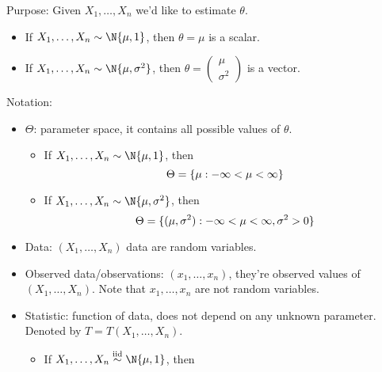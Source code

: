 Purpose: Given $ X_1,\ldots,X_n $ we'd like to estimate
$ \theta $.
\begin{Example}{}{}
      \begin{itemize}
            \item If $ X_1,\ldots,X_n \sim \N{\mu,1} $,
                  then $ \theta=\mu $ is a scalar.
            \item If $ X_1,\ldots,X_n \sim \N{\mu,\sigma^2} $, then
                  $ \theta=\begin{pmatrix}
                              \mu \\
                              \sigma^2
                        \end{pmatrix} $ is a vector.
      \end{itemize}
\end{Example}
Notation:
\begin{itemize}
      \item $ \Theta $: parameter space, it contains all possible values
            of $ \theta $.
            \begin{Example}{}{}
                  \begin{itemize}
                        \item If $ X_1,\ldots,X_n \sim \N{\mu,1} $,
                              then
                              \[ \Theta=\{\mu:-\infty<\mu<\infty\} \]
                        \item If $ X_1,\ldots,X_n \sim \N{\mu,\sigma^2} $, then
                              \[ \Theta=\{(\mu,\sigma^2):-\infty<\mu<\infty,\sigma^2>0\} \]
                  \end{itemize}
            \end{Example}
      \item Data: $ (X_1,\ldots,X_n) $ data are random variables.
      \item Observed data/observations: $ (x_1,\ldots,x_n) $,
            they're observed values of $ (X_1,\ldots,X_n) $.
            Note that
            $ x_1,\ldots,x_n $ are not random variables.
      \item Statistic: function of data, does not depend on any
            unknown parameter. Denoted by $ T=T(X_1,\ldots,X_n) $.
            \begin{Example}{}{}
                  \begin{itemize}
                        \item If $ X_1,\ldots,X_n \stackrel{\text{iid}}{\sim}\N{\mu,1} $,
                              then

\end{itemize}
\end{Example}
\end{itemize}
